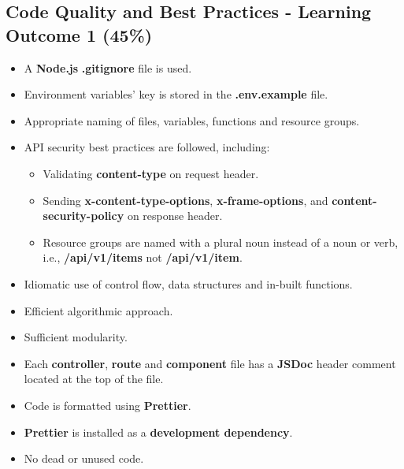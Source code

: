 \documentclass{article}
\begin{document}
\subsection*{Code Quality and Best Practices - Learning Outcome 1 (45\%)}
\begin{itemize}
	\item A \textbf{Node.js} \textbf{.gitignore} file is used.
	\item Environment variables' key is stored in the \textbf{.env.example} file. 
  	\item Appropriate naming of files, variables, functions and resource groups.
  	\item API security best practices are followed, including:
  	\begin{itemize}
		\item Validating \textbf{content-type} on request header.
		\item Sending \textbf{x-content-type-options}, \textbf{x-frame-options}, and \textbf{content-security-policy} on response header.
	\end{itemize}
  \begin{itemize}
	\item Resource groups are named with a plural noun instead of a noun or verb, i.e., \textbf{/api/v1/items} not \textbf{/api/v1/item}.
  \end{itemize}
	\item Idiomatic use of control flow, data structures and in-built functions.
  \item Efficient algorithmic approach.
  \item Sufficient modularity.
  \item Each \textbf{controller}, \textbf{route} and \textbf{component} file has a \textbf{JSDoc} header comment located at the top of the file.
  \item Code is formatted using \textbf{Prettier}.
  \item \textbf{Prettier} is installed as a \textbf{development dependency}.	
\item No dead or unused code. 
\end{itemize}
\end{document}
